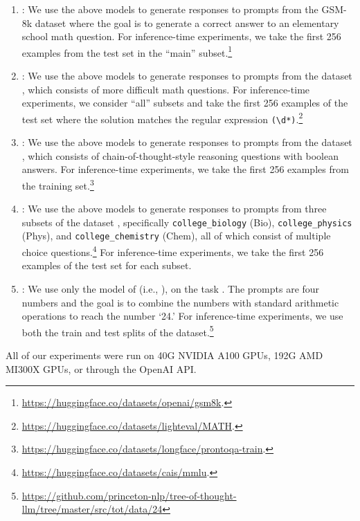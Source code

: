 \begin{enumerate}
      \item \gsm: We use the above models to generate responses to prompts from the GSM-8k dataset \citep{cobbe2021training} where the goal is to generate a correct answer to an elementary school math question. For inference-time experiments, we take the first 256 examples from the test set in the ``main'' subset.\footnote{\url{https://huggingface.co/datasets/openai/gsm8k}.} %
    \item \mathdataset: We use the above models to generate responses to prompts from the \mathdataset dataset \citep{hendrycks2021measuring}, which consists of more difficult math questions.  For inference-time experiments, we consider ``all'' subsets and take the first 256 examples of the test set where the solution matches the regular expression \verb|(\d*)|.\footnote{\url{https://huggingface.co/datasets/lighteval/MATH}.}  %
    \item \prontoqa: We use the above models to generate responses to prompts from the \prontoqa dataset \citep{saparov2023language}, which consists of chain-of-thought-style reasoning questions with boolean answers.  For inference-time experiments, we take the first 256 examples from the training set.\footnote{\url{https://huggingface.co/datasets/longface/prontoqa-train}.} %
    \item \mmlu: We use the above models to generate responses to prompts from three subsets of the \mmlu dataset \citep{hendrycks2020measuring}, specifically \texttt{college\_biology} (Bio), \texttt{college\_physics} (Phys), and \texttt{college\_chemistry} (Chem), all of which consist of multiple choice questions.\footnote{\url{https://huggingface.co/datasets/cais/mmlu}.} For inference-time experiments, we take the first 256 examples of the test set for each subset. 
    \item \gametwentyfour: We use only the model of \iftoggle{workshop}{\cite{wan2024alphazero}}{\citet{wan2024alphazero}} (i.e., \llamagame), on the \gametwentyfour task \citep{yao2024tree}.  The prompts are four numbers and the goal is to combine the numbers with standard arithmetic operations to reach the number `24.'  For inference-time experiments, we use both the train and test splits of the dataset.\footnote{\url{https://github.com/princeton-nlp/tree-of-thought-llm/tree/master/src/tot/data/24}}  %
    \end{enumerate}

    All of our experiments were run on 40G NVIDIA A100 GPUs, 192G AMD MI300X GPUs, or through the OpenAI API.


